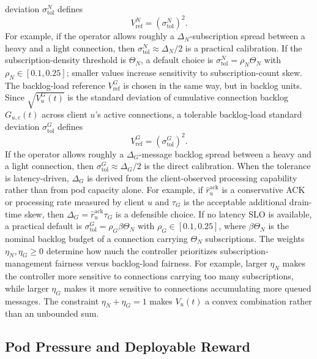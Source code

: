 \documentclass[manuscript,nonacm]{acmart}
\begin{document}
deviation $\sigma^{N}_{\mathrm{tol}}$ defines
\[
	V^N_{\mathrm{ref}}=(\sigma^{N}_{\mathrm{tol}})^2.
\]
For example, if the operator allows roughly a $\Delta_N$-subscription spread
between a heavy and a light connection, then
$\sigma^{N}_{\mathrm{tol}}\approx \Delta_N/2$ is a practical calibration. If
the subscription-density threshold is $\Theta_N$, a default choice is
$\sigma^{N}_{\mathrm{tol}}=\rho_N\Theta_N$ with
$\rho_N\in[0.1,0.25]$; smaller values increase sensitivity to
subscription-count skew.
The backlog-load reference $V^G_{\mathrm{ref}}$ is chosen in the same way,
but in backlog units. Since $\sqrt{V^G_u(t)}$ is the standard deviation of
cumulative connection backlog $G_{u,c}(t)$ across client $u$'s active
connections, a tolerable backlog-load standard deviation
$\sigma^{G}_{\mathrm{tol}}$ defines
\[
	V^G_{\mathrm{ref}}=(\sigma^{G}_{\mathrm{tol}})^2.
\]
If the operator allows roughly a $\Delta_G$-message backlog spread between a
heavy and a light connection, then
$\sigma^{G}_{\mathrm{tol}}\approx \Delta_G/2$ is the direct calibration. When
the tolerance is latency-driven, $\Delta_G$ is derived from the
client-observed processing capability rather than from pod capacity alone. For
example, if $\widehat{r}^{\mathrm{ack}}_{u}$ is a conservative ACK or processing rate
measured by client $u$ and $\tau_G$ is the acceptable additional drain-time
skew, then $\Delta_G=\widehat{r}^{\mathrm{ack}}_{u}\tau_G$ is a defensible choice. If
no latency SLO is available, a practical default is
$\sigma^{G}_{\mathrm{tol}}=\rho_G\beta\Theta_N$ with
$\rho_G\in[0.1,0.25]$, where $\beta\Theta_N$ is the nominal backlog budget of
a connection carrying $\Theta_N$ subscriptions.
The weights $\eta_N,\eta_G\geq0$ determine how much the controller prioritizes
subscription-management fairness versus backlog-load fairness. For example,
larger $\eta_N$ makes the controller more sensitive to connections carrying
too many subscriptions, while larger $\eta_G$ makes it more sensitive to
connections accumulating more queued messages. The constraint
$\eta_N+\eta_G=1$ makes $V_u(t)$ a convex combination rather than an
unbounded sum.

\subsection{Pod Pressure and Deployable Reward}
\end{document}
